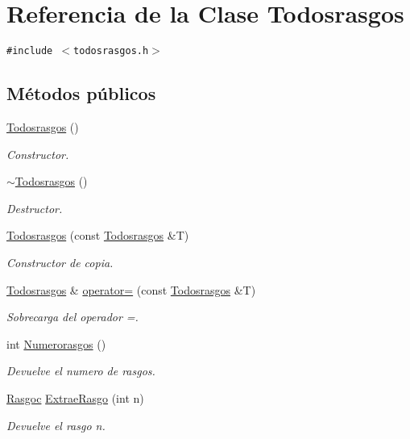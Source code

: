\hypertarget{class_todosrasgos}{
\section{Referencia de la Clase Todosrasgos}
\label{class_todosrasgos}
}
{\tt \#include $<$todosrasgos.h$>$}

\subsection*{Métodos públicos}
\begin{CompactItemize}
\item 
\hyperlink{class_todosrasgos_8a31d936c54899e99dd9ab44a4a194c7}{Todosrasgos} ()
\begin{CompactList}\small\item\em Constructor. \item\end{CompactList}\item 
\hyperlink{class_todosrasgos_07a2e654d9fe7d9de9b0a3bb496d4245}{$\sim$Todosrasgos} ()
\begin{CompactList}\small\item\em Destructor. \item\end{CompactList}\item 
\hyperlink{class_todosrasgos_dd3b73c8157166b8162af9d4547a3afc}{Todosrasgos} (const \hyperlink{class_todosrasgos}{Todosrasgos} \&T)
\begin{CompactList}\small\item\em Constructor de copia. \item\end{CompactList}\item 
\hyperlink{class_todosrasgos}{Todosrasgos} \& \hyperlink{class_todosrasgos_9a31115888d9c9df499b010c6024f450}{operator=} (const \hyperlink{class_todosrasgos}{Todosrasgos} \&T)
\begin{CompactList}\small\item\em Sobrecarga del operador =. \item\end{CompactList}\item 
int \hyperlink{class_todosrasgos_f0d797f1ccf3b1522ff6ab878723e62a}{Numerorasgos} ()
\begin{CompactList}\small\item\em Devuelve el numero de rasgos. \item\end{CompactList}\item 
\hyperlink{class_rasgoc}{Rasgoc} \hyperlink{class_todosrasgos_46e0f44b41dacf2a00c6d697e65b35a4}{ExtraeRasgo} (int n)
\begin{CompactList}\small\item\em Devuelve el rasgo n. \item\end{CompactList}\end{CompactItemize}
